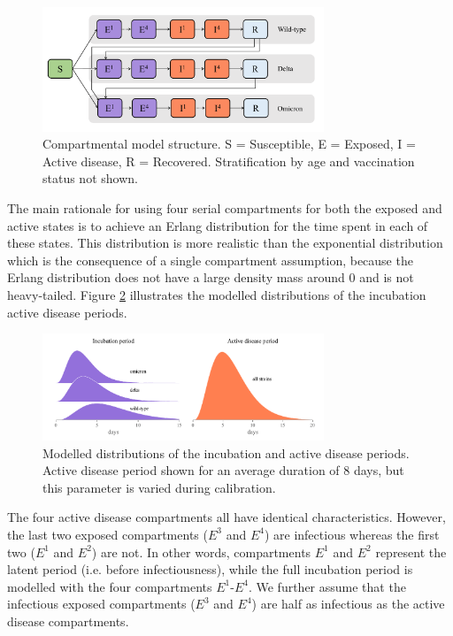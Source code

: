 \begin{figure}[ht]
    \begin{center}
    \includegraphics[width=0.75\textwidth]{../../tex_descriptions/models/sm_covid/sm_covid_se4i4r.pdf}
    \end{center}
    \caption{Compartmental model structure. 
    S = Susceptible, E = Exposed, I = Active disease, R = Recovered.
    Stratification by age and vaccination status not shown.
    } 
    \label{fig:se4i4r}
\end{figure}

The main rationale for using four serial compartments for both the exposed and active states is to achieve an Erlang distribution for the time spent in each of these states. This distribution is more realistic than
the exponential distribution which is the consequence of a single compartment assumption, because the Erlang distribution does not have a large density mass around 0 and is not heavy-tailed. Figure \ref{fig:sojourn} 
illustrates the modelled distributions of the incubation active disease periods. 

\begin{figure}[ht]
    \begin{center}
    \includegraphics[width=0.75\textwidth]{../../tex_descriptions/models/sm_covid/sojourns.pdf}
    \end{center}
    \caption{Modelled distributions of the incubation and active disease periods. Active disease period shown for an average duration of 8 days, but this parameter is varied during calibration.
    } 
    \label{fig:sojourn}
\end{figure}

The four active disease compartments all have identical characteristics. However, the last two exposed compartments ($E^3$ and $E^4$) are infectious whereas the first two ($E^1$ and $E^2$) are not. In other words, compartments 
$E^1$ and $E^2$ represent the latent period (i.e. before infectiousness), while the full incubation period is modelled with the four compartments $E^1$-$E^4$.
 We further assume that the infectious exposed compartments ($E^3$ and $E^4$) are half as infectious as the active disease compartments.

